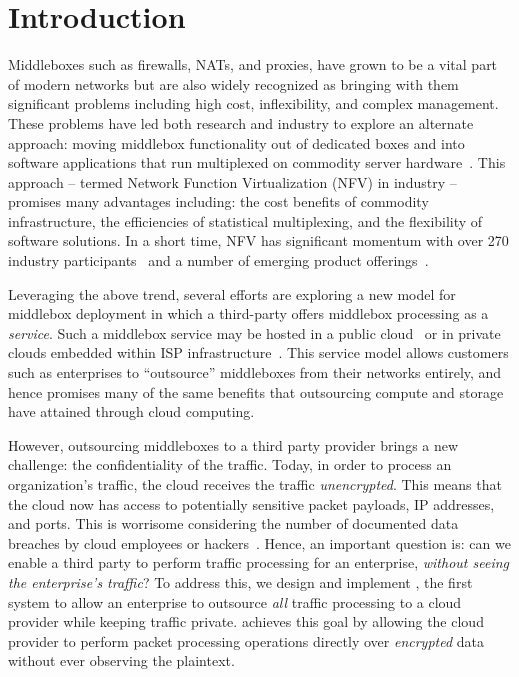 \section{Introduction}\label{sec:intro}

Middleboxes such as firewalls, NATs, and proxies, have grown to be a vital part of modern networks but are 
also widely recognized as bringing  with them significant problems including high cost, inflexibility, and complex management.  
These problems have led both research and industry to explore an alternate approach: moving middlebox functionality out of dedicated boxes and into 
software applications that run multiplexed on commodity server hardware~\cite{mb-manifesto,comb,aplomb,opennf,clickos,flowtags,nfv,domain20,opnfv}.
This approach -- termed Network Function Virtualization (NFV) in industry -- promises many advantages including: the cost benefits of commodity infrastructure, 
the efficiencies of statistical multiplexing, and the flexibility of software solutions. 
In a short time, NFV has significant momentum with over 270 industry participants~\cite{etsi-nfv} and a number of emerging product offerings~\cite{brocade,dell,juniper}.

Leveraging the above trend, several efforts are exploring a new model for middlebox deployment in which a third-party offers middlebox processing as a  
\emph{service}.
Such a middlebox service may be hosted in a public cloud~\cite{aplomb,zscalar,aryaka} or in private clouds embedded within ISP 
infrastructure~\cite{domain20, telefonica, find-more}.  
This service model allows customers such as enterprises to ``outsource'' middleboxes from their networks entirely, and hence promises many of the same 
benefits that outsourcing compute and storage have attained through cloud computing.%

However, outsourcing middleboxes to a third party provider brings a new challenge: the confidentiality of the traffic. 
Today, in order to process an organization's traffic, the cloud receives the traffic {\em unencrypted}.  This means that the cloud 
now has access to potentially sensitive packet payloads,  IP addresses, and ports. This is 
worrisome considering the number of documented data breaches by cloud employees or hackers~\cite{PrivacyRecords}.
Hence, an important question is: can we enable a third party to perform traffic processing for an enterprise, {\em without seeing the enterprise's traffic}?
To address this, we design and implement \sys, the first system to allow an enterprise to outsource {\it all} traffic processing to a cloud provider while keeping traffic private. 
\sys achieves this goal by allowing the cloud provider to perform packet processing operations directly over {\it encrypted} data without ever observing the plaintext.


